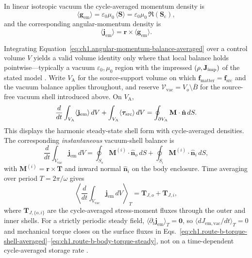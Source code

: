 In linear isotropic vacuum the cycle-averaged momentum density is
\begin{equation}
\label{eq:ch1.rotation-generator-split}
\langle\mathbf{g}_{\mathrm{em}}\rangle=\varepsilon_0\mu_0\,\langle\mathbf{S}\rangle
=\varepsilon_0\mu_0\,\Re(\mathbf{S}_\mathrm{c}),
\end{equation}
and the corresponding angular-momentum density is
\begin{equation}
\label{eq:ch1.angular-momentum-density}
\langle\mathbf{j}_{\mathrm{em}}\rangle=\mathbf{r}\times\langle\mathbf{g}_{\mathrm{em}}\rangle.
\end{equation}

Integrating Equation~\eqref{eq:ch1.angular-momentum-balance-averaged} over a control volume $V$ yields a valid volume identity only where that local balance holds pointwise---typically a vacuum $\varepsilon_0,\mu_0$ region with the impressed $(\rho,\mathbf{J}_{\mathrm{imp}})$ of the stated model \cite{stratton1941}. Write $V_{\mathrm{A}}$ for the source-support volume on which $\mathbf{f}_{\mathrm{matter}}=\mathbf{f}_{\mathrm{src}}$ and the vacuum balance applies throughout, and reserve $\mathcal{V}_{\mathrm{vac}}=V_o\setminus\overline{B}$ for the source-free vacuum shell introduced above. On $V_{\mathrm{A}}$,
\begin{equation}
\label{eq:ch1.angular-balance-integral}
\frac{d}{dt}\int_{V_{\mathrm{A}}} \langle\mathbf{j}_{\mathrm{em}}\rangle\,dV
+\int_{V_{\mathrm{A}}} \langle\boldsymbol{\tau}_{\mathrm{src}}\rangle\,dV
=\oint_{\partial V_{\mathrm{A}}}\mathbf{M}\cdot\hat{\mathbf{n}}\,dS.
\end{equation}
This displays the harmonic steady-state shell form with cycle-averaged densities. The corresponding \emph{instantaneous} vacuum-shell balance is
\begin{equation}
\label{eq:ch1.angular-balance-instantaneous-shell}
\frac{d}{dt}\int_{V_{\mathrm{vac}}}\mathbf{j}_{\mathrm{em}}\,dV
=\oint_{S_o}\mathbf{M}^{(i)}\cdot\hat{\mathbf{n}}_o\,dS
+\oint_{S_i}\mathbf{M}^{(i)}\cdot\hat{\mathbf{n}}_i\,dS,
\end{equation}
with $\mathbf{M}^{(i)}=\mathbf{r}\times\mathbf{T}$ and inward normal $\hat{\mathbf{n}}_i$ on the body enclosure. Time averaging over period $T=2\pi/\omega$ gives
\begin{equation}
\label{eq:ch1.angular-balance-cycle-average}
\left\langle\frac{d}{dt}\int_{V_{\mathrm{vac}}}\mathbf{j}_{\mathrm{em}}\,dV\right\rangle_T
=\mathbf{T}_{J,o}+\mathbf{T}_{J,i},
\end{equation}
where $\mathbf{T}_{J,\{o,i\}}$ are the cycle-averaged stress-moment fluxes through the outer and inner shells. For a strictly periodic steady field, $\langle\partial_t\mathbf{j}_{\mathrm{em}}\rangle_T=\mathbf{0}$, so $\langle dJ_{\mathrm{em,vac}}/dt\rangle_T=0$ and mechanical torque closes on the surface fluxes in Eqs.~\eqref{eq:ch1.route-b-torque-shell-averaged}--\eqref{eq:ch1.route-b-body-torque-steady}, not on a time-dependent cycle-averaged storage rate \cite{beth1936,stratton1941}.
